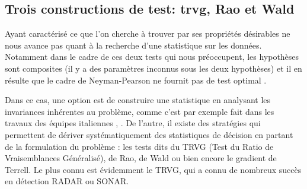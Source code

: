 
\subsection{Trois constructions de test: trvg, Rao et Wald}
\label{subsec:detection-glrt-rao-wald}


Ayant caractérisé ce que l'on cherche à trouver par ses propriétés désirables ne nous avance pas quant à la recherche d'une statistique sur les données. Notamment dans le cadre de ces deux tests qui nous préoccupent, les hypothèses sont composites (il y a des paramètres inconnus sous les deux hypothèses) et il en résulte que le cadre de Neyman-Pearson  ne fournit pas de test optimal .

Dans ce cas, une option est de construire une statistique en analysant les invariances inhérentes au problème, comme c'est par exemple fait dans les travaux des équipes italiennes , . De l'autre, il existe des stratégies qui permettent de dériver systématiquement des statistiques de décision en partant de la formulation du problème : les tests dits du TRVG (Test du Ratio de Vraisemblances Généralisé), de Rao, de Wald ou bien encore le gradient de Terrell. Le plus connu est évidemment le TRVG, qui a connu de nombreux succès en détection RADAR ou SONAR.




